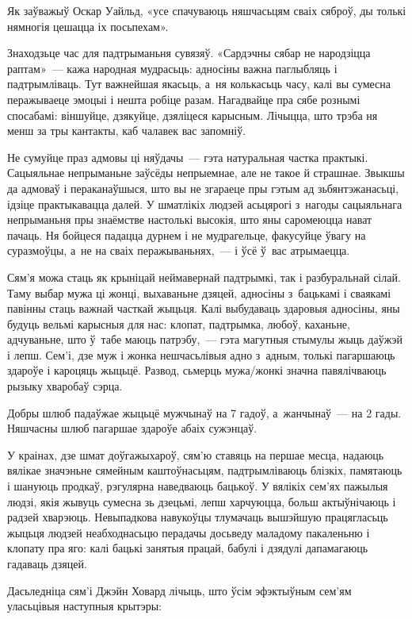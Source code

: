 Як заўважыў Оскар Уайльд, «усе спачуваюць няшчасьцям сваіх сяброў, ды толькі нямногія цешацца іх посьпехам».

Знаходзьце час для падтрыманьня сувязяў. «Сардэчны сябар не народзіцца раптам»~--- кажа народная мудрасьць: адносіны важна паглыбляць і падтрымліваць. Тут важнейшая якасьць, а~ня колькасьць часу, калі вы сумесна перажываеце эмоцыі і нешта робіце разам. Нагадвайце пра сябе рознымі спосабамі: віншуйце, дзякуйце, дзяліцеся карысным. Лічыцца, што трэба ня менш за тры кантакты, каб чалавек вас запомніў.

Не сумуйце праз адмовы ці няўдачы~--- гэта натуральная частка практыкі. Сацыяльнае непрыманьне заўсёды непрыемнае, але не такое й страшнае. Звыкшы да адмоваў і пераканаўшыся, што вы не згараеце пры гэтым ад зьбянтэжанасьці, ідзіце практыкавацца далей. У шматлікіх людзей асьцярогі з~нагоды сацыяльнага непрыманьня пры знаёмстве настолькі высокія, што яны саромеюцца нават пачаць. Ня бойцеся падацца дурнем і не мудрагельце, факусуйце ўвагу на суразмоўцы, а~не на сваіх перажываньнях,~--- і ўсё ў~вас атрымаецца.

Сям'я можа стаць як крыніцай неймавернай падтрымкі, так і разбуральнай сілай. Таму выбар мужа ці жонці, выхаваньне дзяцей, адносіны з~бацькамі і сваякамі павінны стаць важнай часткай жыцьця. Калі выбудаваць здаровыя адносіны, яны будуць вельмі карысныя для нас: клопат, падтрымка, любоў, каханьне, адчуваньне, што ў~табе маюць патрэбу,~--- гэта магутныя стымулы жыць даўжэй і лепш. Сем'і, дзе муж і жонка нешчасьлівыя адно з~адным, толькі пагаршаюць здароўе і кароцяць жыцьцё. Развод, сьмерць мужа/жонкі значна павялічваюць рызыку хваробаў сэрца. 

Добры шлюб падаўжае жыцьцё мужчынаў на 7 гадоў, а~жанчынаў~--- на 2 гады. Няшчасны шлюб пагаршае здароўе абаіх сужэнцаў.

У краінах, дзе шмат доўгажыхароў, сям'ю ставяць на першае месца, надаюць вялікае значэньне сямейным каштоўнасьцям, падтрымліваюць блізкіх, памятаюць і шануюць продкаў, рэгулярна наведваюць бацькоў. У вялікіх сем'ях пажылыя людзі, якія жывуць сумесна зь дзецьмі, лепш харчуюцца, больш актыўнічаюць і радзей хварэюць. Невыпадкова навукоўцы тлумачаць вышэйшую працягласьць жыцьця людзей неабходнасьцю перадачы досьведу маладому пакаленьню і клопату пра яго: калі бацькі занятыя працай, бабулі і дзядулі дапамагаюць гадаваць дзяцей.

Дасьледніца сям'і Джэйн Ховард лічыць, што ўсім эфэктыўным сем'ям уласьцівыя наступныя крытэры: 

